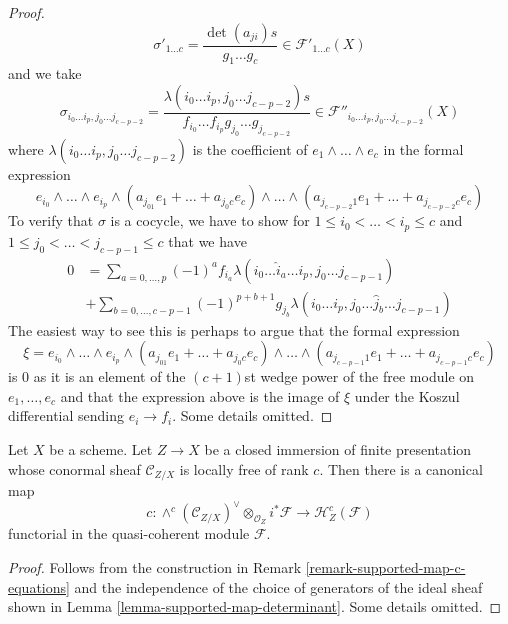 \begin{proof}
$$\sigma'_{1 \ldots c} = \frac{\det(a_{ji})s}{g_1 \ldots g_c} \in
\mathcal{F}'_{1 \ldots c}(X)
$$
and we take
$$
\sigma_{i_0 \ldots i_p, j_0 \ldots j_{c - p - 2}} =
\frac{\lambda(i_0 \ldots i_p, j_0 \ldots j_{c - p - 2})s}%
{f_{i_0} \ldots f_{i_p}g_{j_0} \ldots g_{j_{c - p - 2}}}
\in \mathcal{F}''_{i_0 \ldots i_p, j_0 \ldots j_{c - p - 2}}(X)
$$
where $\lambda(i_0 \ldots i_p, j_0 \ldots j_{c - p - 2})$
is the coefficient of $e_1 \wedge \ldots \wedge e_c$ in
the formal expression
$$
e_{i_0} \wedge \ldots \wedge e_{i_p} \wedge
(a_{j_01} e_1 + \ldots + a_{j_0c}e_c) \wedge \ldots \wedge
(a_{j_{c - p - 2}1} e_1 + \ldots + a_{j_{c - p - 2}c}e_c)
$$
To verify that $\sigma$ is a cocycle, we have to show for
$1 \leq i_0 < \ldots < i_p \leq c$ and
$1 \leq j_0 < \ldots < j_{c - p - 1} \leq c$
that we have
\begin{align*}
0 & =
\sum\nolimits_{a = 0, \ldots, p} (-1)^a
f_{i_a} \lambda(i_0 \ldots \hat i_a \ldots i_p, j_0 \ldots j_{c - p - 1}) \\
& +
\sum\nolimits_{b = 0, \ldots, c - p - 1} (-1)^{p + b + 1}g_{j_b}
\lambda(i_0 \ldots i_p, j_0 \ldots \hat j_b \ldots j_{c - p - 1})
\end{align*}
The easiest way to see this is perhaps to argue that the formal expression
$$
\xi = e_{i_0} \wedge \ldots \wedge e_{i_p} \wedge
(a_{j_01} e_1 + \ldots + a_{j_0c}e_c) \wedge \ldots \wedge
(a_{j_{c - p - 1}1} e_1 + \ldots + a_{j_{c - p - 1}c}e_c)
$$
is $0$ as it is an element of the $(c + 1)$st wedge power of the free module
on $e_1, \ldots, e_c$ and that the expression above is the image of
$\xi$ under the Koszul differential sending $e_i \to f_i$. Some details
omitted.
\end{proof}

\begin{lemma}
\label{lemma-supported-map-global}
Let $X$ be a scheme. Let $Z \to X$ be a closed immersion of finite presentation
whose conormal sheaf $\mathcal{C}_{Z/X}$ is locally free of rank $c$.
Then there is a canonical map
$$
c :
\wedge^c(\mathcal{C}_{Z/X})^\vee \otimes_{\mathcal{O}_Z} i^*\mathcal{F}
\longrightarrow
\mathcal{H}_Z^c(\mathcal{F})
$$
functorial in the quasi-coherent module $\mathcal{F}$.
\end{lemma}

\begin{proof}
Follows from the construction in
Remark \ref{remark-supported-map-c-equations}
and the independence of the choice
of generators of the ideal sheaf shown in
Lemma \ref{lemma-supported-map-determinant}.
Some details omitted.
\end{proof}


